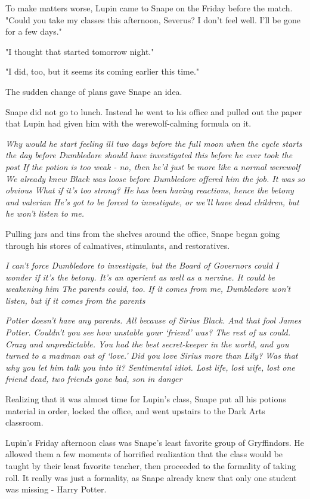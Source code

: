 To make matters worse, Lupin came to Snape on the Friday before the match. "Could you take my classes this afternoon, Severus? I don't feel well. I'll be gone for a few days."

"I thought that started tomorrow night."

"I did, too, but it seems its coming earlier this time."

The sudden change of plans gave Snape an idea.

Snape did not go to lunch. Instead he went to his office and pulled out the paper that Lupin had given him with the werewolf-calming formula on it.

\emph{Why would he start feeling ill two days before the full moon when the cycle starts the day before{\el} Dumbledore should have investigated this before he ever took the post{\el} If the potion is too weak - no, then he'd just be more like a normal werewolf{\el} We already knew Black was loose before Dumbledore offered him the job. It was so obvious{\el} What if it's too strong? He has been having reactions, hence the betony and valerian{\el} He's got to be forced to investigate, or we'll have dead children, but he won't listen to me.}

Pulling jars and tins from the shelves around the office, Snape began going through his stores of calmatives, stimulants, and restoratives.

\emph{I can't force Dumbledore to investigate, but the Board of Governors could{\el} I wonder if it's the betony. It's an aperient as well as a nervine. It could be weakening him{\el} The parents could, too. If it comes from me, Dumbledore won't listen, but if it comes from the parents{\el}}

\emph{Potter doesn't have any parents. All because of Sirius Black. And that fool James Potter. Couldn't you see how unstable your `friend' was? The rest of us could. Crazy and unpredictable. You had the best secret-keeper in the world, and you turned to a madman out of `love.' Did you love Sirius more than Lily? Was that why you let him talk you into it? Sentimental idiot. Lost life, lost wife, lost one friend dead, two friends gone bad, son in danger{\el}}

Realizing that it was almost time for Lupin's class, Snape put all his potions material in order, locked the office, and went upstairs to the Dark Arts classroom.

Lupin's Friday afternoon class was Snape's least favorite group of Gryffindors. He allowed them a few moments of horrified realization that the class would be taught by their least favorite teacher, then proceeded to the formality of taking roll. It really was just a formality, as Snape already knew that only one student was missing - Harry Potter.


